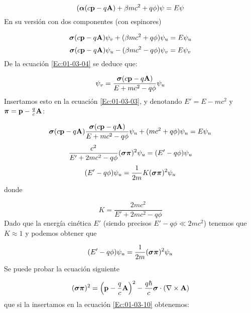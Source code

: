 \begin{equation}
    (\boldsymbol{\alpha} (c\mathbf{p} - q\mathbf{A}) + \beta m c^2  + q \phi) \psi = E\psi
\end{equation}
En su versión con dos componentes (con espinores)

\begin{equation}
    \boldsymbol{\sigma} (c\mathbf{p} - q\mathbf{A}) \psi_v + (\beta m c^2  + q \phi) \psi_u = E\psi_u \label{Ec:01-03-03}
\end{equation}
\begin{equation}
    \boldsymbol{\sigma} (c\mathbf{p} - q\mathbf{A}) \psi_u - (\beta m c^2  - q \phi) \psi_v = E\psi_v \label{Ec:01-03-04}
\end{equation}
De la ecuación \ref{Ec:01-03-04} se deduce que:

\begin{equation}
    \psi_v = \frac{\boldsymbol{\sigma} (c \mathbf{p} - q \mathbf{A})}{E+mc^2 - q\phi} \psi_u
\end{equation}
Insertamos esto en la ecuación \ref{Ec:01-03-03}, y denotando $E'=E-mc^2$ y $\boldsymbol{\pi} = \mathbf{p} - \frac{q}{c}\mathbf{A}$:

\begin{equation}
    \boldsymbol{\sigma} (c\mathbf{p} - q\mathbf{A}) \frac{\boldsymbol{\sigma} (c\mathbf{p} - q \mathbf{A})}{E+mc^2 - q\phi} \psi_u + (mc^2 + q\phi) \psi_u = E\psi_u
\end{equation}
\begin{equation}
    \frac{c^2}{E'+2mc^2-q\phi} (\boldsymbol{\sigma} \boldsymbol{\pi})^2  \psi_u = (E'- q \phi) \psi_u
\end{equation}
\begin{equation}
    (E'-q\phi) \psi_u = \frac{1}{2m} K (\boldsymbol{\sigma} \boldsymbol{\pi})^2 \psi_u 
\end{equation}
donde

\begin{equation}
K =  \frac{2mc^2}{E'+2mc^2-q\phi} 
\end{equation}
Dado que la energía cinética $E'$ (siendo precisos $E'-q\phi \ll 2mc^2$) tenemos que $K \approx 1$ y podemos obtener que

\begin{equation}
    (E' - q\phi) \psi_u = \frac{1}{2m} (\boldsymbol{\sigma} \boldsymbol{\pi})^2 \psi_u \label{Ec:01-03-10}
\end{equation}
Se puede probar la ecuación siguiente

\begin{equation}
    (\boldsymbol{\sigma} \boldsymbol{\pi})^2 = \left( \mathbf{p} - \frac{q}{c} \mathbf{A} \right)^2 - \frac{q \hbar}{c} \boldsymbol{\sigma} \cdot (\nabla \times \mathbf{A})
\end{equation}
que si la insertamos en la ecuación \ref{Ec:01-03-10} obtenemos:

